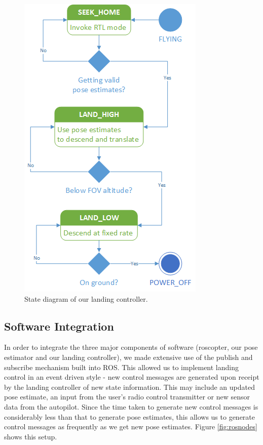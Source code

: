 \documentclass[10pt]{scrartcl} %
\begin{document}
\begin{figure}[h]
    \centering
    \includegraphics{images/statediagram.png}
    \caption{State diagram of our landing controller.}
    \label{fig:statediagram}
\end{figure}

\subsection{Software Integration}
In order to integrate the three major components of software (roscopter, our pose estimator and our landing controller), we made extensive use of the publish and subscribe mechanism built into ROS. This allowed us to implement landing control in an event driven style - new control messages are generated upon receipt by the landing controller of new state information. This may include an updated pose estimate, an input from the user's radio control transmitter or new sensor data from the autopilot. Since the time taken to generate new control messages is considerably less than that to generate pose estimates, this allows us to generate control messages as frequently as we get new pose estimates. Figure \ref{fig:rosnodes} shows this setup.
\end{document}
